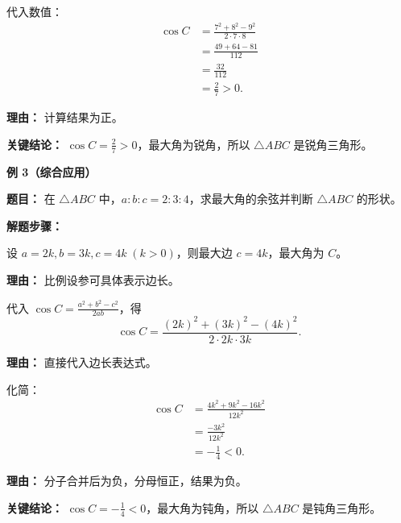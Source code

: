\begin{examplebox}
\begin{description}[style=nextline, leftmargin=2.8em, labelsep=0.5em, itemsep=0.45em]
		\item[\textbf{第三步（代入计算）：}] 代入数值：
			\[
				\begin{aligned}
					\cos C &= \frac{7^{2}+8^{2}-9^{2}}{2\cdot7\cdot8} \\
					&= \frac{49+64-81}{112} \\
					&= \frac{32}{112} \\
					&= \frac{2}{7} > 0.
			\end{aligned}
			\]
			\par\textbf{理由：} 计算结果为正。
	\end{description}

	\textbf{\textcolor{CExample}{关键结论：}}
	$\cos C = \frac{2}{7}>0$，最大角为锐角，所以 $\triangle ABC$ 是锐角三角形。

	\medskip
	\textbf{\textcolor{CExample}{例 3（综合应用）}}

	\textbf{\textcolor{CExample}{题目：}}
	在 $\triangle ABC$ 中，$a:b:c=2:3:4$，求最大角的余弦并判断 $\triangle ABC$ 的形状。

	\textbf{\textcolor{CExample}{解题步骤：}}
	\begin{description}[style=nextline, leftmargin=2.8em, labelsep=0.5em, itemsep=0.45em]
		\item[\textbf{第一步（设参数表示边）：}] 设 $a=2k, b=3k, c=4k\;(k>0)$，则最大边 $c=4k$，最大角为 $C$。
			\par\textbf{理由：} 比例设参可具体表示边长。

		\item[\textbf{第二步（套用公式）：}] 代入 $\cos C = \frac{a^{2}+b^{2}-c^{2}}{2ab}$，得
			\[
				\cos C = \frac{(2k)^{2}+(3k)^{2}-(4k)^{2}}{2\cdot2k\cdot3k}.
			\]
			\par\textbf{理由：} 直接代入边长表达式。

		\item[\textbf{第三步（化简求值）：}] 化简：
			\[
				\begin{aligned}
					\cos C &= \frac{4k^{2}+9k^{2}-16k^{2}}{12k^{2}} \\
					&= \frac{-3k^{2}}{12k^{2}} \\
					&= -\frac{1}{4} < 0.
			\end{aligned}
			\]
			\par\textbf{理由：} 分子合并后为负，分母恒正，结果为负。
	\end{description}

	\textbf{\textcolor{CExample}{关键结论：}}
	$\cos C = -\frac{1}{4}<0$，最大角为钝角，所以 $\triangle ABC$ 是钝角三角形。
\end{examplebox}
